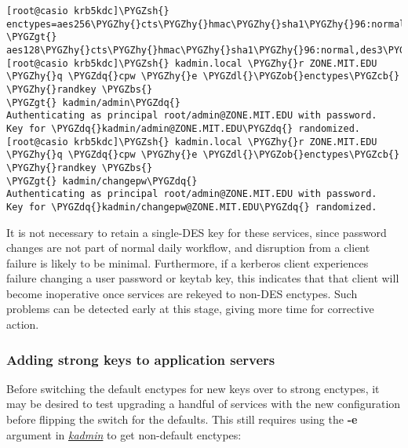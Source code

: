 \documentclass[letterpaper,10pt,english]{sphinxmanual}
\def\PYGZbs{\char`\\}
\def\PYGZob{\char`\{}
\def\PYGZcb{\char`\}}
\def\PYGZgt{\char`\>}
\def\PYGZsh{\char`\#}
\def\PYGZdl{\char`\$}
\def\PYGZhy{\char`\-}
\def\PYGZdq{\char`\"}
\begin{document}
\begin{Verbatim}[commandchars=\\\{\}]
[root@casio krb5kdc]\PYGZsh{} enctypes=aes256\PYGZhy{}cts\PYGZhy{}hmac\PYGZhy{}sha1\PYGZhy{}96:normal,\PYGZbs{}
\PYGZgt{} aes128\PYGZhy{}cts\PYGZhy{}hmac\PYGZhy{}sha1\PYGZhy{}96:normal,des3\PYGZhy{}hmac\PYGZhy{}sha1:normal
[root@casio krb5kdc]\PYGZsh{} kadmin.local \PYGZhy{}r ZONE.MIT.EDU \PYGZhy{}q \PYGZdq{}cpw \PYGZhy{}e \PYGZdl{}\PYGZob{}enctypes\PYGZcb{} \PYGZhy{}randkey \PYGZbs{}
\PYGZgt{} kadmin/admin\PYGZdq{}
Authenticating as principal root/admin@ZONE.MIT.EDU with password.
Key for \PYGZdq{}kadmin/admin@ZONE.MIT.EDU\PYGZdq{} randomized.
[root@casio krb5kdc]\PYGZsh{} kadmin.local \PYGZhy{}r ZONE.MIT.EDU \PYGZhy{}q \PYGZdq{}cpw \PYGZhy{}e \PYGZdl{}\PYGZob{}enctypes\PYGZcb{} \PYGZhy{}randkey \PYGZbs{}
\PYGZgt{} kadmin/changepw\PYGZdq{}
Authenticating as principal root/admin@ZONE.MIT.EDU with password.
Key for \PYGZdq{}kadmin/changepw@ZONE.MIT.EDU\PYGZdq{} randomized.
\end{Verbatim}

It is not necessary to retain a single-DES key for these services, since
password changes are not part of normal daily workflow, and disruption
from a client failure is likely to be minimal.  Furthermore, if a kerberos
client experiences failure changing a user password or keytab key,
this indicates that that client will become inoperative once services
are rekeyed to non-DES enctypes.  Such problems can be detected early
at this stage, giving more time for corrective action.


\subsubsection{Adding strong keys to application servers}
\label{admin/advanced/retiring-des:adding-strong-keys-to-application-servers}
Before switching the default enctypes for new keys over to strong enctypes,
it may be desired to test upgrading a handful of services with the
new configuration before flipping the switch for the defaults.  This
still requires using the \textbf{-e} argument in {\hyperref[admin/admin_commands/kadmin_local:kadmin-1]{\emph{kadmin}}} to get non-default
enctypes:
\end{document}
